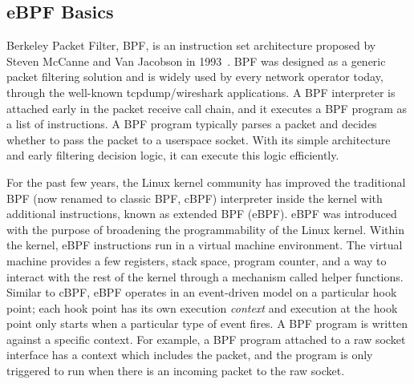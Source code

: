 \documentclass[10pt]{sigplanconf}
\newcommand{\mycomment}[1]{}
\begin{document}
\mycomment{
As each new feature in OVS datapath requires deep knowledge and programming
paradigm of the target operating system, e.g., how Linux packets are received,
how Windows kernel module does firewalling, and each operating system
community has its own software upstream and maintenance processes, the software
development cycle of a new datapath feature becomes complex and requires
detailed platform-specific knowledge. Each platform introduces its own
development and maintenance burden, and it is common for new features to take
six months or more before implementations are available across all datapaths.
As a result, providing a programmable OVS datapath which allows extending the
features flexibly with lower maintenance cost becomes a critical requirement.
}

\subsection{eBPF Basics}\label{sec:ebpf}
Berkeley Packet Filter, BPF, is an instruction set architecture
proposed by Steven McCanne and Van Jacobson in 1993~\cite{cbpf}.  
BPF was designed as a generic packet filtering solution and is widely
used by every network operator today, through the well-known tcpdump/wireshark
applications. A BPF interpreter is attached early in the packet receive call
chain, and it executes a BPF program as a list of instructions.
A BPF program typically parses a packet and decides
whether to pass the packet to a userspace socket.  With its simple architecture
and early filtering decision logic, it can execute this logic efficiently.

For the past few years, the Linux kernel community has improved the traditional
BPF (now renamed to classic BPF, cBPF) interpreter inside the kernel with
additional instructions, known as extended BPF (eBPF). eBPF was introduced with
the purpose of broadening the programmability of the Linux kernel. Within the
kernel, eBPF instructions run in a virtual machine environment. The virtual
machine provides a few registers, stack space, program counter, and a way to
interact with the rest of the kernel through a mechanism called helper
functions.  Similar to cBPF, eBPF operates in an event-driven model on a
particular hook point; each hook point has its own execution {\em context} and
execution at the hook point only starts when a particular type of event fires.
A BPF program is written against a specific context. For example, a BPF program
attached to a raw socket interface has a context which includes the packet, and
the program is only triggered to run when there is an incoming packet to the
raw socket.
\end{document}
